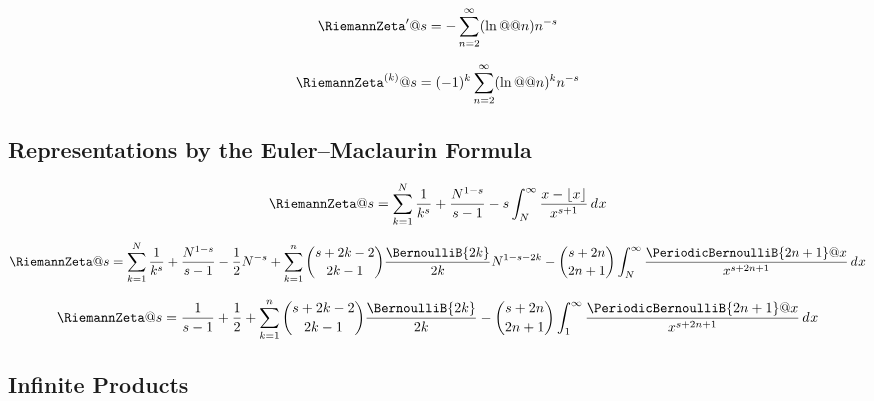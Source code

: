 \documentclass{article}
\begin{document}
 
\begin{equation}\label{eq:ZE.EX.ZE5}
  \RiemannZeta'@{s} = - \sum_{n=2}^\infty (\ln@@{n}) n^{-s}
\end{equation}

\begin{equation}\label{eq:ZE.EX.ZE6}
  \RiemannZeta^{(k)}@{s} = \opminus^k \sum_{n=2}^\infty (\ln@@{n})^k n^{-s}
\end{equation}

\subsection{Representations by the Euler--Maclaurin Formula}
\label{sec:ZE.Def.EMF}


\begin{equation}\label{eq:ZE.EX.EM1}
  \RiemannZeta@{s}
  = \sum_{k=1}^N \frac{1}{k^s}
  + \frac{N^{1-s}}{s-1}
  - s \int_N^\infty \frac{x-\floor{x}}{x^{s+1}} \diff{x}
\end{equation}

\begin{equation}\label{eq:ZE.EX.EM2}
  \RiemannZeta@{s}
  = \sum_{k=1}^N \frac{1}{k^s} + \frac{N^{1-s}}{s-1} - \frac{1}{2}N^{-s}
  + \sum_{k=1}^n \binom{s+2k-2}{2k-1} \frac{\BernoulliB{2k}}{2k} N^{1-s-2k}
  - \binom{s+2n}{2n+1}
    \int_N^\infty \frac{\PeriodicBernoulliB{2n+1}@{x}}{x^{s+2n+1}} \diff{x}
\end{equation}

\begin{equation}\label{eq:ZE.EX.EM3}
  \RiemannZeta@{s}
  = \frac{1}{s-1} + \frac{1}{2}
  + \sum_{k=1}^n \binom{s+2k-2}{2k-1} \frac{\BernoulliB{2k}}{2k}
  - \binom{s+2n}{2n+1}
    \int_1^\infty \frac{\PeriodicBernoulliB{2n+1}@{x}}{x^{s+2n+1}} \diff{x}
\end{equation}

\subsection{Infinite Products}\label{sec:ZE.Def.IP}
\end{document}

